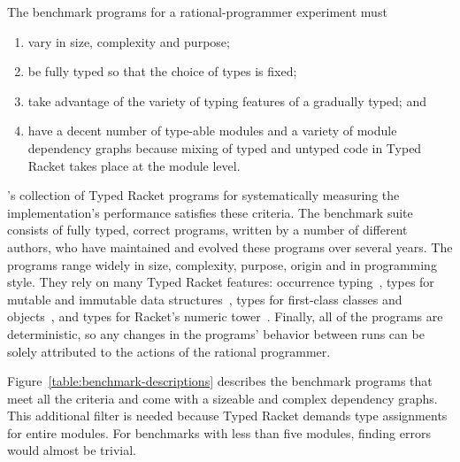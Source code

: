 
The benchmark programs for a rational-programmer experiment must 
\begin{enumerate}
   
\item vary in size, complexity and purpose;

\item be fully typed so that the choice of types is fixed; 
    
\item take advantage of the variety of typing features of a gradually
typed; and

\item have a decent number of type-able modules and a variety of module dependency graphs
 because mixing of typed and untyped code in Typed Racket takes place at the
 module level. 

\end{enumerate}

\citet{gtnffvf-jfp-2019}'s collection of Typed Racket programs for
systematically measuring the implementation's performance satisfies these
criteria. The benchmark suite consists of fully typed, correct programs, written
by a number of different authors, who have maintained and evolved these programs
over several years. The programs range widely in size, complexity, purpose,
origin and in programming style. They rely on many Typed Racket features:
occurrence typing~\citep{tf-icfp-2010}, types for mutable and immutable data
structures~\citep{hpst-sfp-2010}, types for first-class classes and
objects~\citep{tsdtf-oopsla-2012}, and types for Racket's numeric
tower~\citep{stathff-padl-12}.  Finally, all of the programs are deterministic,
so any changes in the programs' behavior between runs can be solely attributed
to the actions of the rational programmer.

Figure~\ref{table:benchmark-descriptions} describes the benchmark programs that
meet all the criteria and come with a sizeable and complex dependency graphs.
This additional filter is needed because Typed Racket demands type assignments
for entire modules. For benchmarks with less than five modules, finding errors
would almost be trivial.

